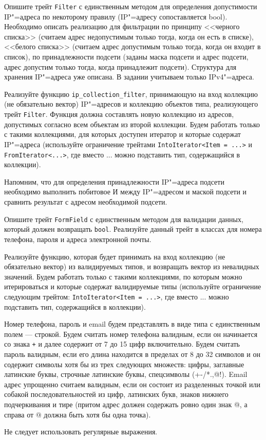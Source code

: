 \documentclass[a4paper, 10pt]{extarticle}
\begin{document}
\begin{tsk}[IP"=фильтр]
    Опишите трейт \verb|Filter| с единственным методом для определения допустимости IP"=адреса по некоторому правилу (IP"=адресу сопоставляется bool). Необходимо описать реализацию для фильтрации по принципу <<черного списка>> (считаем адрес недопустимым только тогда, когда он есть в списке), <<белого списка>> (считаем адрес допустимым только тогда, когда он входит в список), по принадлежности подсети (заданы маска подсети и адрес подсети, адрес допустим только тогда, когда принадлежит подсети). Структура для хранения IP"=адреса уже описана. В задании учитываем только IPv4"=адреса.

    Реализуйте функцию \verb|ip_collection_filter|, принимающую на вход коллекцию (не обязательно вектор) IP"=адресов и коллекцию объектов типа, реализующего трейт \verb|Filter|. Функция должна составлять новую коллекцию из адресов, допустимых согласно всем объектам из второй коллекции. Будем работать только с такими коллекциями, для которых доступен итератор и которые содержат IP"=адреса (используйте ограничение трейтами \verb|IntoIterator<Item = ...>| и \verb|FromIterator<...>|, где вместо ... можно подставить тип, содержащийся в коллекции).

    Напомним, что для определения принадлежности IP"=адреса подсети необходимо выполнить побитовое И между IP"=адресом и маской подсети и сравнить результат с адресом необходимой подсети.
\end{tsk}

\begin{tsk}[Валидатор]
    Опишите трейт \verb|FormField| с единственным методом для валидации данных, который должен возвращать \verb|bool|. Реализуйте данный трейт в классах для номера телефона, пароля и адреса электронной почты.
    
    Реализуйте функцию, которая будет принимать на вход коллекцию (не обязательно вектор) из валидируемых типов, и возвращать вектор из невалидных значений. Будем работать только с такими коллекциями, по которым можно итерироваться и которые содержат валидируемые типы (используйте ограничение следующим трейтом: \verb|IntoIterator<Item = ...>|, где вместо ... можно подставить тип, содержащийся в коллекции).

    Номер телефона, пароль и email будем представлять в виде типа с единственным полем --- строкой. Будем считать номер телефона валидным, если он начинается со знака \verb|+| и далее содержит от 7 до 15 цифр включительно. Будем считать пароль валидным, если его длина находится в пределах от 8 до 32 символов и он содержит символы хотя бы из трех следующих множеств: цифры, заглавные латинские буквы, строчные латинские буквы, спецсимволы (+-/*.,@!). Email адрес упрощенно считаем валидным, если он состоит из разделенных точкой или собакой последовательностей из цифр, латинских букв, знаков нижнего подчеркивания и тире (притом адрес должен содержать ровно один знак @, а справа от @ должна быть хотя бы одна точка).
    
    Не следует использовать регулярные выражения.
\end{tsk}
\end{document}
